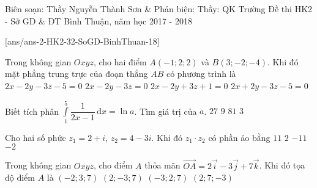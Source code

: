 \begin{name}
{Biên soạn: Thầy Nguyễn Thành Sơn \& Phản biện: Thầy: QK Trường}
{Đề thi HK2 - Sở GD \& ĐT Bình Thuận, năm học 2017 - 2018}
\end{name}
\setcounter{ex}{0}\setcounter{bt}{0}
[ans/ans-2-HK2-32-SoGD-BinhThuan-18]
\begin{ex}%
	Trong không gian $Oxyz$, cho hai điểm $A(-1;2;2)$ và $B(3;-2;-4)$. Khi đó mặt phẳng trung trực của đoạn thẳng $AB$ có phương trình là
	\choice
	{\True $2x-2y-3z-5=0$}
	{$2x-2y-3z=0$}
	{$2x-2y+3z+1=0$}
	{$2x+2y-3z-5=0$}
\end{ex}
\begin{ex}%
	Biết tích phân $\displaystyle\int\limits_1^5 \dfrac{1}{2x-1}\mathrm{\,d}x=\ln a$. Tìm giá trị của $a$.
	\choice
	{$27$}
	{$9$}
	{$81$}
	{\True $3$}
\end{ex}
\begin{ex}%
	Cho hai số phức $z_1=2+i$, $z_2=4-3i$. Khi đó $z_1 \cdot z_2$ có phần ảo bằng
	\choice
	{$11$}
	{$2$}
	{$-11$}
	{\True $-2$}
\end{ex}
\begin{ex}%
	Trong không gian $Oxyz$, cho điểm $A$ thỏa mãn $\overrightarrow{OA}=2\overrightarrow{i}-3\overrightarrow{j}+7\overrightarrow{k}$. Khi đó tọa độ điểm $A$ là
	\choice
	{$(-2;3;7)$}
	{\True $(2;-3;7)$}
	{$(-3;2;7)$}
	{$(2;7;-3)$}
\end{ex}

